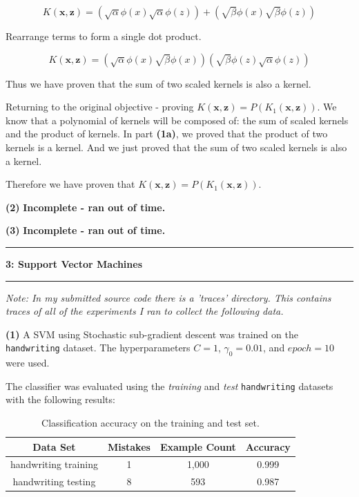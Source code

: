 \documentclass[11pt]{article}
\newcommand\question[2]{\vspace{.25in}\hrule\textbf{#1: #2}\vspace{.5em}\hrule\vspace{.10in}}
\renewcommand\part[1]{\vspace{.10in}\textbf{(#1)}}
\begin{document}
$$K(\mathbf{x, z}) = (\sqrt{\alpha}\phi(x)\sqrt{\alpha}\phi(z)) + (\sqrt{\beta}\phi(x)\sqrt{\beta}\phi(z))$$

Rearrange terms to form a single dot product.

$$K(\mathbf{x, z}) = (\sqrt{\alpha}\phi(x)\sqrt{\beta}\phi(x))(\sqrt{\beta}\phi(z)\sqrt{\alpha}\phi(z))$$

Thus we have proven that the sum of two scaled kernels is also a kernel.

Returning to the original objective - proving $K(\mathbf{x, z}) = P(K_1(\mathbf{x, z}))$. We know that a polynomial of kernels will be composed of: the sum of scaled kernels and the product of kernels. In part \textbf{(1a)}, we proved that the product of two kernels is a kernel. And we just proved that the sum of two scaled kernels is also a kernel.

Therefore we have proven that $K(\mathbf{x, z}) = P(K_1(\mathbf{x, z}))$.

\part{2} \textbf{Incomplete - ran out of time.}

\part{3} \textbf{Incomplete - ran out of time.}

\question{3}{Support Vector Machines}
\textit{Note: In my submitted source code there is a 'traces' directory. This contains traces of all of the experiments I ran to collect the following data.}

\part{1} A SVM using Stochastic sub-gradient descent was trained on the {\tt handwriting} dataset. The hyperparameters $C = 1$, $\gamma_0 = 0.01$, and $epoch = 10$ were used.

The classifier was evaluated using the \textit{training} and \textit{test} {\tt handwriting} datasets with the following results:

 \begin{table}[H]
\centering
{\renewcommand{\arraystretch}{1.2}%
\begin{tabular}{| c | c | c | c |}
\hline
Data Set & Mistakes & Example Count & Accuracy\\
\hline
handwriting training & 1 & 1,000 & 0.999\\ \hline
handwriting testing & 8 & 593 & 0.987\\ \hline
\end{tabular}}
\caption{Classification accuracy on the training and test set.}
\end{table}
\end{document}
